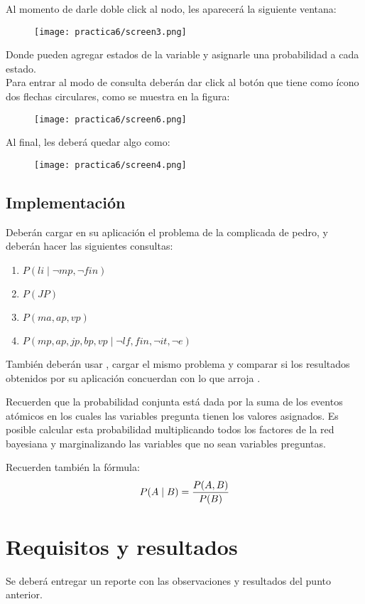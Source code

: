 \noindent Al momento de darle doble click al nodo, les aparecerá la siguiente ventana:

\begin{figure}[H]
  \centering
  \texttt{[image: practica6/screen3.png]}
  \caption{}
\end{figure}

\noindent Donde pueden agregar estados de la variable y asignarle una probabilidad a cada estado.\\

\noindent Para entrar al modo de consulta deberán dar click al botón que tiene como ícono dos flechas circulares, como se muestra en la figura:

\begin{figure}[H]
  \centering
  \texttt{[image: practica6/screen6.png]}
  \caption{}
\end{figure}

\noindent Al final, les deberá quedar algo como:

\begin{figure}[H]
  \centering
  \texttt{[image: practica6/screen4.png]}
  \caption{}
\end{figure}

\subsection{Implementaci\'on}

\noindent Deberán cargar en su aplicación el problema de la complicada de pedro, y deberán hacer las siguientes consultas:

\begin{enumerate}
  \item \(P(li \mid \neg mp, \neg fin)\)
  \item \(P(JP)\)
  \item \(P(ma, ap, vp)\)
  \item \(P(mp, ap, jp, bp, vp \mid \neg lf, fin, \neg it, \neg e)\)
\end{enumerate}


\noindent También deberán usar , cargar el mismo problema y comparar si los resultados obtenidos por su aplicación concuerdan con lo que arroja .\\\par

\noindent Recuerden que la probabilidad conjunta está dada por la suma de los eventos atómicos en los cuales las variables pregunta tienen los valores asignados. Es posible calcular esta probabilidad multiplicando todos los factores de la red bayesiana y marginalizando las variables que no sean variables preguntas.\\\par

\noindent Recuerden también la fórmula:\\ \[ P( A \mid B ) = {P(A,B) \over P(B)} \]


\section{Requisitos y resultados}

\noindent Se deberá entregar un reporte con las observaciones y resultados del punto anterior.\\\par


